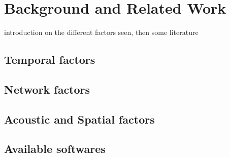 \section{Background and Related Work}

introduction on the different factors seen, then some literature

\subsection{Temporal factors}
\subsection{Network factors}
\subsection{Acoustic and Spatial factors}


\subsection{Available softwares}